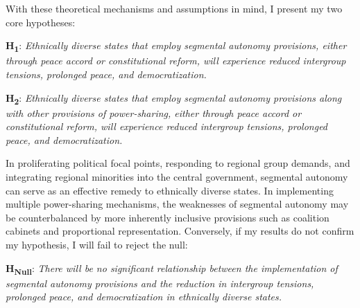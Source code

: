 \documentclass[12pt]{article}
\begin{document}
With these theoretical mechanisms and assumptions in mind, I present my two core hypotheses:

\singlespacing

\textbf{H\textsubscript{1}}: \textit{Ethnically diverse states that employ segmental autonomy provisions, either through peace accord or constitutional reform, will experience reduced intergroup tensions, prolonged peace, and democratization.}

\bigskip

\textbf{H\textsubscript{2}}: \textit{Ethnically diverse states that employ segmental autonomy provisions along with other provisions of power-sharing, either through peace accord or constitutional reform, will experience reduced intergroup tensions, prolonged peace, and democratization.}

\doublespacing

In proliferating political focal points, responding to regional group demands, and integrating regional minorities into the central government, segmental autonomy can serve as an effective remedy to ethnically diverse states. In implementing multiple power-sharing mechanisms, the weaknesses of segmental autonomy may be counterbalanced by more inherently inclusive provisions such as coalition cabinets and proportional representation. Conversely, if my results do not confirm my hypothesis, I will fail to reject the null: 

\singlespacing

\textbf{H\textsubscript{Null}}: \textit{There will be no significant relationship between the implementation of segmental autonomy provisions and the reduction in intergroup tensions, prolonged peace, and democratization in ethnically diverse states.}

\doublespacing
\end{document}
